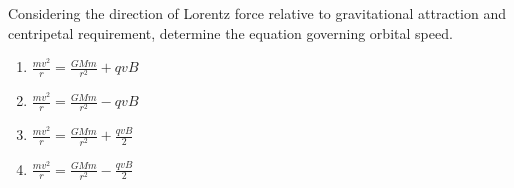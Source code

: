 \documentclass[12pt]{article}
\begin{document}
Considering the direction of Lorentz force relative to gravitational attraction and centripetal requirement, determine the equation governing orbital speed.

\begin{enumerate}
\item[(A)] $\frac{mv^2}{r}=\frac{GMm}{r^2}+qvB$
\item[(B)] $\frac{mv^2}{r}=\frac{GMm}{r^2}-qvB$
\item[(C)] $\frac{mv^2}{r}=\frac{GMm}{r^2}+\frac{qvB}{2}$
\item[(D)] $\frac{mv^2}{r}=\frac{GMm}{r^2}-\frac{qvB}{2}$
\end{enumerate}

\end{document}
